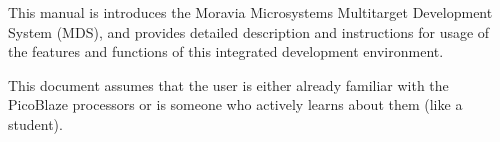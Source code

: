 This manual is introduces the Moravia Microsystems Multitarget Development System (MDS), and provides detailed description and instructions for usage of the features and functions of this integrated development environment.

This document assumes that the user is either already familiar with the PicoBlaze processors or is someone who actively learns about them (like a student).
